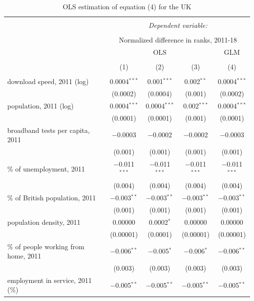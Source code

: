 \documentclass[10pt,letterpaper]{article}
\begin{document}
\begin{table}[!htbp] \centering 
  \caption{OLS estimation of equation (4) for the UK\label{ols.uk}} 
  \label{} 
\small 
\begin{tabular}{@{\extracolsep{5pt}}lcccc} 
\\[-1.8ex]\hline 
\hline \\[-1.8ex] 
 & \multicolumn{4}{c}{\textit{Dependent variable:}} \\ 
\cline{2-5} 
\\[-1.8ex] & \multicolumn{4}{c}{Normalized difference in ranks, 2011-18} \\ 
 & \multicolumn{3}{c}{OLS} & GLM \\ 
\\[-1.8ex] & (1) & (2) & (3) & (4)\\ 
\hline \\[-1.8ex] 
 download speed, 2011 (log) & 0.0004$^{***}$ & 0.001$^{***}$ & 0.002$^{**}$ & 0.0004$^{***}$ \\ 
  & (0.0002) & (0.0004) & (0.001) & (0.0002) \\ 
  population, 2011 (log) & 0.0004$^{***}$ & 0.0004$^{***}$ & 0.002$^{***}$ & 0.0004$^{***}$ \\ 
  & (0.0001) & (0.0001) & (0.001) & (0.0001) \\ 
  broadband tests per capita, 2011 & $-$0.0003 & $-$0.0002 & $-$0.0002 & $-$0.0003 \\ 
  & (0.001) & (0.001) & (0.001) & (0.001) \\ 
  \% of unemployment, 2011 & $-$0.011$^{***}$ & $-$0.011$^{***}$ & $-$0.011$^{***}$ & $-$0.011$^{***}$ \\ 
  & (0.004) & (0.004) & (0.004) & (0.004) \\ 
  \% of British population, 2011 & $-$0.003$^{**}$ & $-$0.003$^{**}$ & $-$0.003$^{**}$ & $-$0.003$^{**}$ \\ 
  & (0.001) & (0.001) & (0.001) & (0.001) \\ 
  population density, 2011 & 0.00000 & 0.0002$^{*}$ & 0.00000 & 0.00000 \\ 
  & (0.00001) & (0.0001) & (0.00001) & (0.00001) \\ 
  \% of people working from home, 2011 & $-$0.006$^{**}$ & $-$0.005$^{*}$ & $-$0.006$^{*}$ & $-$0.006$^{**}$ \\ 
  & (0.003) & (0.003) & (0.003) & (0.003) \\ 
  employment in service, 2011 (\%) & $-$0.005$^{**}$ & $-$0.005$^{**}$ & $-$0.005$^{**}$ & $-$0.005$^{**}$ \\ 

\end{tabular}
\end{table}
\end{document}
